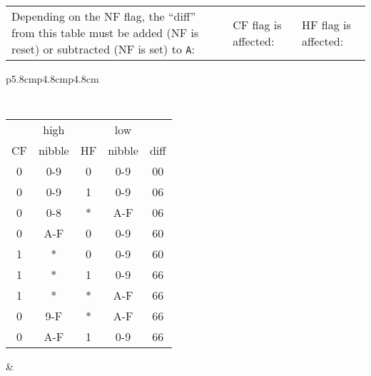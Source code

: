 {
	\footnotesize

	\begin{tabular}{b{5.8cm}b{4.8cm}b{4.8cm}}
		Depending on the NF flag, the ``diff'' from this table must be added (NF is reset) or subtracted (NF is set) to {\tt A}:
		&
		CF flag is affected:
		&
		HF flag is affected: \\
	\end{tabular}

	\begin{tabular}{p{5.8cm}p{4.8cm}p{4.8cm}}

		{\tt
			\begin{tabular}[t]{c|c|c|c|c}
				   &  high   &    & low    &  \\
				CF &  nibble & HF & nibble & diff \\
				\hline
				0 & 0-9     &  0 & 0-9    &  00  \\
				0 & 0-9     &  1 & 0-9    &  06  \\
				0 & 0-8     &  * & A-F    &  06  \\
				0 & A-F     &  0 & 0-9    &  60  \\
				1 &  *      &  0 & 0-9    &  60  \\
				1 &  *      &  1 & 0-9    &  66  \\
				1 &  *      &  * & A-F    &  66  \\
				0 & 9-F     &  * & A-F    &  66  \\
				0 & A-F     &  1 & 0-9    &  66  \\
				\hline
			\end{tabular}
		}

		&


\end{tabular}}
